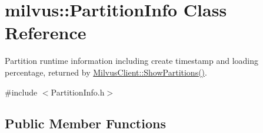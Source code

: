 \hypertarget{classmilvus_1_1_partition_info}{}\section{milvus\+:\+:Partition\+Info Class Reference}
\label{classmilvus_1_1_partition_info}


Partition runtime information including create timestamp and loading percentage, returned by \hyperlink{classmilvus_1_1_milvus_client_a12b481158b57a806f8d341178348f735}{Milvus\+Client\+::\+Show\+Partitions()}.  




{\ttfamily \#include $<$Partition\+Info.\+h$>$}

\subsection*{Public Member Functions}
